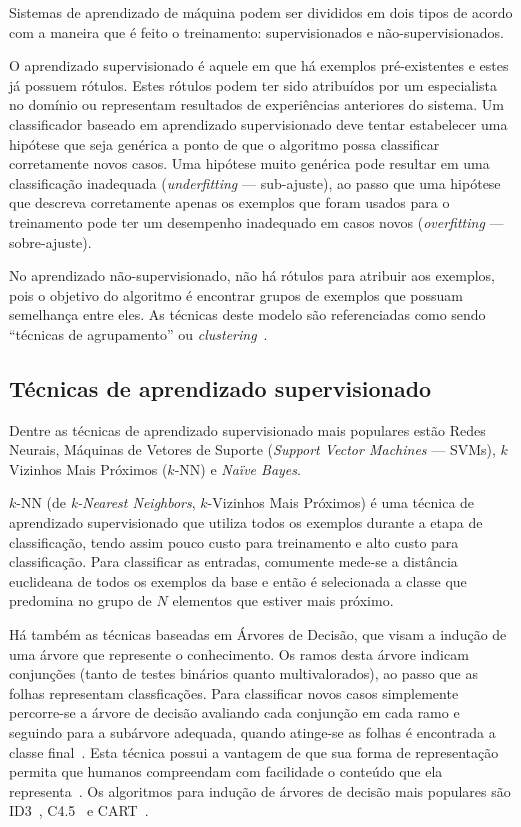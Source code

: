 Sistemas de aprendizado de máquina podem ser divididos em dois tipos de acordo com a maneira que é feito o treinamento: supervisionados e não-supervisionados.

O aprendizado supervisionado é aquele em que há exemplos pré-existentes e estes já possuem rótulos. Estes rótulos podem ter sido atribuídos por um especialista no domínio ou representam resultados de experiências anteriores do sistema. Um classificador baseado em aprendizado supervisionado deve tentar estabelecer uma hipótese que seja genérica a ponto de que o algoritmo possa classificar corretamente novos casos. Uma hipótese muito genérica pode resultar em uma classificação inadequada (\emph{underfitting} --- sub-ajuste), ao passo que uma hipótese que descreva corretamente apenas os exemplos que foram usados para o treinamento pode ter um desempenho inadequado em casos novos (\emph{overfitting} --- sobre-ajuste).

No aprendizado não-supervisionado, não há rótulos para atribuir aos exemplos, pois o objetivo do algoritmo é encontrar grupos de exemplos que possuam semelhança entre eles. As técnicas deste modelo são referenciadas como sendo ``técnicas de agrupamento'' ou \emph{clustering}~\cite{rezende2003sistemas}.

\subsection{Técnicas de aprendizado supervisionado}

Dentre as técnicas de aprendizado supervisionado mais populares estão Redes Neurais, Máquinas de Vetores de Suporte (\emph{Support Vector Machines} --- SVMs), $k$ Vizinhos Mais Próximos ($k$-NN) e \emph{Naïve Bayes}.


$k$-NN (de \emph{k-Nearest Neighbors}, $k$-Vizinhos Mais Próximos) é uma técnica de aprendizado supervisionado que utiliza todos os exemplos durante a etapa de classificação, tendo assim pouco custo para treinamento e alto custo para classificação. Para classificar as entradas, comumente mede-se a distância euclideana de todos os exemplos da base e então é selecionada a classe que predomina no grupo de $N$ elementos que estiver mais próximo\cite{tan2006effective}.

Há também as técnicas baseadas em Árvores de Decisão, que visam a indução de uma árvore que represente o conhecimento. Os ramos desta árvore indicam conjunções (tanto de testes binários quanto multivalorados), ao passo que as folhas representam classficações. Para classificar novos casos simplemente percorre-se a árvore de decisão avaliando cada conjunção em cada ramo e seguindo para a subárvore adequada, quando atinge-se as folhas é encontrada a classe final~\cite{de-categorizacao}. Esta técnica possui a vantagem de que sua forma de representação permita que humanos compreendam com facilidade o conteúdo que ela representa~\cite[p. 52]{mitchell1997machine}. Os algoritmos para indução de árvores de decisão mais populares são ID3~\cite{quinlan1986induction}, C4.5~\cite{quinlan1993programs} e CART~\cite{breiman1984classification}.

